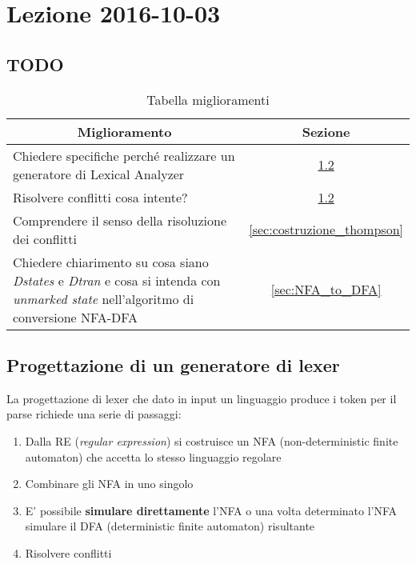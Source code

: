 \section{Lezione 2016-10-03}
\subsection{TODO}
\begin{table}[ht]
\begin{center}
\begin{tabular}{|p{\textwidth}|c|}
\hline
\multicolumn{1}{|c|}{\textbf{Miglioramento}} & \textbf{Sezione} \\ \hline
Chiedere specifiche perché realizzare un generatore di Lexical Analyzer
& \ref{sec:lexer_generatore} \\ \hline
Risolvere conflitti cosa intente? & \ref{sec:lexer_generatore} \\ \hline
Comprendere il senso della risoluzione dei conflitti &
\ref{sec:costruzione_thompson} \\ \hline
Chiedere chiarimento su cosa siano \textit{Dstates} e \textit{Dtran} e cosa si
intenda con \textit{unmarked state} nell'algoritmo di conversione NFA-DFA &
\ref{sec:NFA_to_DFA} \\ \hline
\end{tabular}
\end{center}
\caption{Tabella miglioramenti}
\label{tab:tab_todo}
\end{table}

\subsection{Progettazione di un generatore di lexer}
\label{sec:lexer_generatore}
La progettazione di lexer che dato in input un linguaggio produce i token per il
parse richiede una serie di passaggi:
\begin{enumerate}
\item Dalla RE (\textit{regular expression}) si costruisce un NFA
(non-deterministic finite automaton) che accetta lo stesso linguaggio regolare
\item Combinare gli NFA in uno singolo
\item E' possibile \textbf{simulare direttamente} l'NFA o una volta determinato
l'NFA simulare il DFA (deterministic finite automaton) risultante
\item Risolvere conflitti
\end{enumerate}

